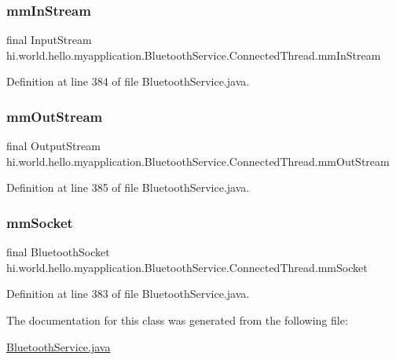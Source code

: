 \subsubsection{\texorpdfstring{mmInStream}{mmInStream}}
{\footnotesize\ttfamily final Input\+Stream hi.\+world.\+hello.\+myapplication.\+Bluetooth\+Service.\+Connected\+Thread.\+mm\+In\+Stream\hspace{0.3cm}{\ttfamily [private]}}



Definition at line 384 of file Bluetooth\+Service.\+java.

\mbox{\label{classhi_1_1world_1_1hello_1_1myapplication_1_1_bluetooth_service_1_1_connected_thread_a789142080b296c7e957149ad09ae6d12}} 
\subsubsection{\texorpdfstring{mmOutStream}{mmOutStream}}
{\footnotesize\ttfamily final Output\+Stream hi.\+world.\+hello.\+myapplication.\+Bluetooth\+Service.\+Connected\+Thread.\+mm\+Out\+Stream\hspace{0.3cm}{\ttfamily [private]}}



Definition at line 385 of file Bluetooth\+Service.\+java.

\mbox{\label{classhi_1_1world_1_1hello_1_1myapplication_1_1_bluetooth_service_1_1_connected_thread_accbbef3426eff4d76f627fde819e8962}} 
\subsubsection{\texorpdfstring{mmSocket}{mmSocket}}
{\footnotesize\ttfamily final Bluetooth\+Socket hi.\+world.\+hello.\+myapplication.\+Bluetooth\+Service.\+Connected\+Thread.\+mm\+Socket\hspace{0.3cm}{\ttfamily [private]}}



Definition at line 383 of file Bluetooth\+Service.\+java.



The documentation for this class was generated from the following file\+:\begin{DoxyCompactItemize}
\item 
\mbox{\hyperlink{_bluetooth_service_8java}{Bluetooth\+Service.\+java}}\end{DoxyCompactItemize}
